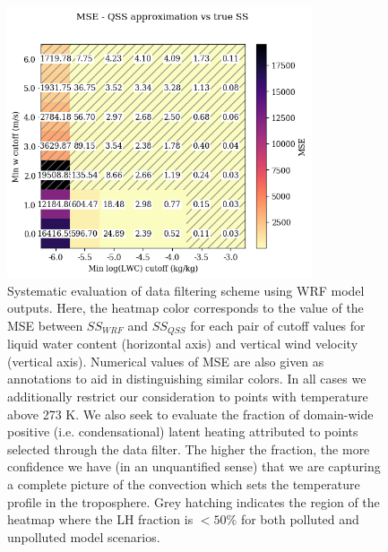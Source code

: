 \documentclass{article}
\begin{document}
\begin{figure}[ht]
    \centering
    \includegraphics[width=9cm]{wrf/filtering_criteria_mse_figure.png}
    \caption{Systematic evaluation of data filtering scheme using WRF model outputs. Here, the heatmap color corresponds to the value of the MSE between $SS_{WRF}$ and $SS_{QSS}$ for each pair of cutoff values for liquid water content (horizontal axis) and vertical wind velocity (vertical axis). Numerical values of MSE are also given as annotations to aid in distinguishing similar colors. In all cases we additionally restrict our consideration to points with temperature above 273 K. We also seek to evaluate the fraction of domain-wide positive (i.e. condensational) latent heating attributed to points selected through the data filter. The higher the fraction, the more confidence we have (in an unquantified sense) that we are capturing a complete picture of the convection which sets the temperature profile in the troposphere. Grey hatching indicates the region of the heatmap where the LH fraction is $< 50\%$ for both polluted and unpolluted model scenarios.}
    \label{filtcritheatmap}
\end{figure}
\end{document}
